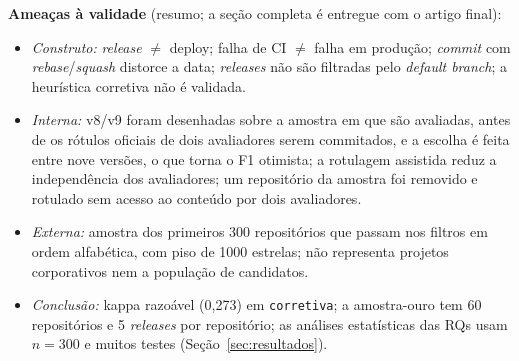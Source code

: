 \textbf{Ameaças à validade} (resumo; a seção completa é entregue com o artigo final):
\begin{itemize}
  \item \emph{Construto:} \textit{release} $\neq$ deploy; falha de CI $\neq$ falha em produção;
  \textit{commit} com \textit{rebase}/\textit{squash} distorce a data; \textit{releases} não são
  filtradas pelo \textit{default branch}; a heurística corretiva não é validada.
  \item \emph{Interna:} v8/v9 foram desenhadas sobre a amostra em que são avaliadas, antes de os rótulos
  oficiais de dois avaliadores serem commitados, e a escolha é feita entre nove versões, o que torna o F1
  otimista; a rotulagem assistida reduz a independência dos avaliadores; um repositório da amostra foi
  removido e rotulado sem acesso ao conteúdo por dois avaliadores.
  \item \emph{Externa:} amostra dos primeiros 300 repositórios que passam nos filtros em ordem
  alfabética, com piso de 1000 estrelas; não representa projetos corporativos nem a população de
  candidatos.
  \item \emph{Conclusão:} kappa razoável (0,273) em \texttt{corretiva}; a amostra-ouro tem 60 repositórios e
  5 \textit{releases} por repositório; as análises estatísticas das RQs usam $n=300$ e muitos testes (Seção~\ref{sec:resultados}).
\end{itemize}
